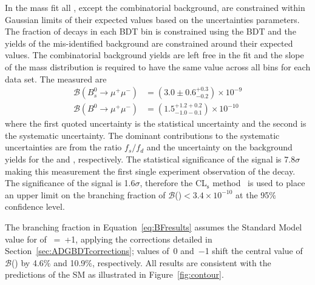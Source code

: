 {In the mass fit all \pdfs, except the combinatorial background, are constrained within Gaussian limits of their expected values based on the uncertainties \pdf parameters. 
The fraction of \bmumu decays in each BDT bin is constrained using the BDT \pdf and the yields of the mis-identified background are constrained around their expected values. The combinatorial background yields are left free in the fit and the slope of the mass distribution is required to have the same value across all bins for each data set.
The measured \BFs are
\begin{equation}
\begin{split}
  \mathcal{B}(B^{0}_{s} \to \mu^{+} \mu^{-}) &= (3.0 \pm 0.6^{+0.3}_{-0.2}) \times 10^{-9} \\
  \mathcal{B}(B^{0} \to \mu^{+} \mu^{-}) &= (1.5^{+1.2 +0.2}_{-1.0 -0.1})    \times 10^{-10} 
\end{split}
\label{eq:BFresults}
\end{equation}
where the first quoted uncertainty is the statistical uncertainty and the second is the systematic uncertainty. The dominant contributions to the systematic uncertainties are from the ratio $f_s / f_d$ and the uncertainty on the background yields for the \bsmumu and \bdmumu \BFs, respectively. %
The statistical significance of the \bsmumu signal is 7.8$\sigma$ making this measurement the first single experiment observation of the \bsmumu decay. The significance of the \bdmumu signal is 1.6$\sigma$, therefore the CL$_{\text{s}}$ method~\cite{0954-3899-28-10-313} is used to place an upper limit on the branching fraction of $\mathcal{B}$(\bdmumu)$ < 3.4 \times 10^{-10}$ at the 95$\%$ confidence level.

The \bsmumu branching fraction in Equation~\ref{eq:BFresults} assumes the Standard Model value for \ADG of \ADG~=~+1, applying the corrections detailed in Section~\ref{sec:ADGBDTcorrections}; \ADG values of~0 and~$-$1 shift the central value of $\mathcal{B}$(\bsmumu) by 4.6$\%$ and 10.9$\%$, respectively. All results are consistent with the predictions of the SM as illustrated in Figure~\ref{fig:contour}.


}
